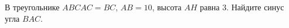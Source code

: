 \begin{ex}
	\begin{condition}
		 В треугольнике \( ABC AC=BC\), \(AB=10\), высота \(AH\) равна \(3\). Найдите синус угла \(BAC\).
	\end{condition}
\end{ex}
